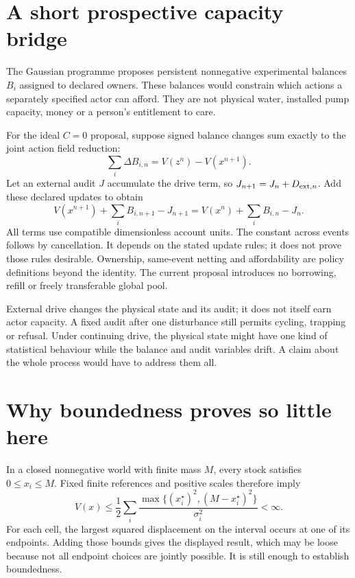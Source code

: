 \section{A short prospective capacity bridge}
The Gaussian programme proposes persistent nonnegative experimental balances $B_i$ assigned to declared owners. These balances would constrain which actions a separately specified actor can afford. They are not physical water, installed pump capacity, money or a person's entitlement to care.

For the ideal $C=0$ proposal, suppose signed balance changes sum exactly to the joint action field reduction:
\begin{equation*}
 \sum_i\Delta B_{i,n}=V(z^n)-V(x^{n+1}).
\end{equation*}
Let an external audit $J$ accumulate the drive term, so $J_{n+1}=J_n+D_{{\rm ext},n}$. Add these declared updates to obtain
\begin{equation}\label{eq:capacity}
 V(x^{n+1})+\sum_i B_{i,n+1}-J_{n+1}
 =V(x^n)+\sum_i B_{i,n}-J_n.
\end{equation}
All terms use compatible dimensionless account units. The constant across events follows by cancellation. It depends on the stated update rules; it does not prove those rules desirable. Ownership, same-event netting and affordability are policy definitions beyond the identity. The current proposal introduces no borrowing, refill or freely transferable global pool.\cite{gaussian}

External drive changes the physical state and its audit; it does not itself earn actor capacity. A fixed audit after one disturbance still permits cycling, trapping or refusal. Under continuing drive, the physical state might have one kind of statistical behaviour while the balance and audit variables drift. A claim about the whole process would have to address them all.

\section{Why boundedness proves so little here}
In a closed nonnegative world with finite mass $M$, every stock satisfies $0\leq x_i\leq M$. Fixed finite references and positive scales therefore imply
\begin{equation}\label{eq:bound}
 V(x)\leq\frac12\sum_i
 \frac{\max\{(x_i^\star)^2,(M-x_i^\star)^2\}}{\sigma_i^2}<\infty.
\end{equation}
For each cell, the largest squared displacement on the interval occurs at one of its endpoints. Adding those bounds gives the displayed result, which may be loose because not all endpoint choices are jointly possible. It is still enough to establish boundedness.\cite{gaussian}

